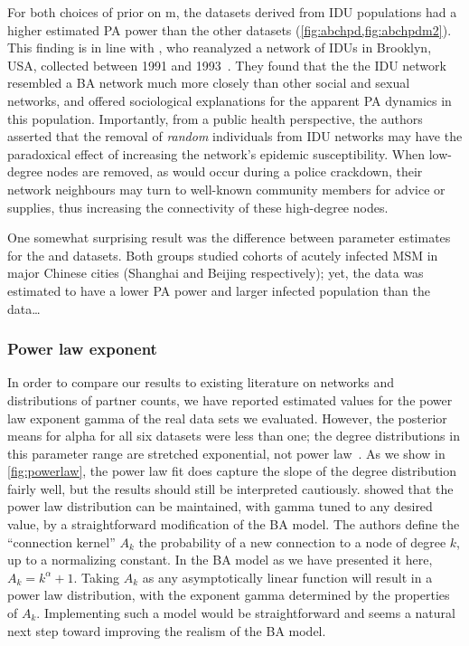 For both choices of prior on \gls{m}, the datasets derived from \gls{IDU}
populations had a higher estimated \acrlong{PA} power than the other datasets
(\cref{fig:abchpd,fig:abchpdm2}). This finding is in line with
\textcite{dombrowski2013topological}, who reanalyzed a network of \glspl{IDU}
in Brooklyn, USA, collected between 1991 and
1993~\autocite{friedman2006social}. They found that the the \gls{IDU} network 
resembled a \gls{BA} network much more closely than other social and sexual 
networks, and offered sociological explanations for the apparent \acrlong{PA}
dynamics in this population. Importantly, from a public health perspective,
the authors asserted that the removal of \emph{random} individuals from
\gls{IDU} networks may have the paradoxical effect of increasing the network's
epidemic susceptibility. When low-degree nodes are removed, as would occur
during a police crackdown, their network neighbours may turn to well-known
community members for advice or supplies, thus increasing the connectivity of
these high-degree nodes.

One somewhat surprising result was the difference between parameter estimates 
for the \textcite{li2015hiv} and \textcite{wang2015targeting} datasets. Both
groups studied cohorts of acutely infected \gls{MSM} in major Chinese cities
(Shanghai and Beijing respectively); yet, the \citeauthor{li2015hiv} data was 
estimated to have a lower \acrlong{PA} power and larger infected population
than the \textcite{wang2015targeting} data\ldots

\subsubsection{Power law exponent}

In order to compare our results to existing literature on networks and
distributions of partner counts, we have reported estimated values for the
power law exponent \gls{gamma} of the real data sets we evaluated. However, the
posterior means for \gls{alpha} for all six datasets were less than one; the
degree distributions in this parameter range are stretched exponential, not
power law~\autocite{krapivsky2000connectivity}. As we show in
\cref{fig:powerlaw}, the power law fit does capture the slope of the degree
distribution fairly well, but the results should still be interpreted
cautiously. \textcite{krapivsky2000connectivity} showed that the power law
distribution can be maintained, with \gls{gamma} tuned to any desired value, by
a straightforward modification of the \gls{BA} model. The authors define the
``connection kernel'' $A_k$ the probability of a new connection to a node of
degree $k$, up to a normalizing constant. In the \gls{BA} model as we have
presented it here, $A_k = k^{\alpha} + 1$. Taking $A_k$ as any asymptotically
linear function will result in a power law distribution, with the exponent
\gls{gamma} determined by the properties of $A_k$. Implementing such a model
would be straightforward and seems a natural next step toward improving the
realism of the \gls{BA} model.

